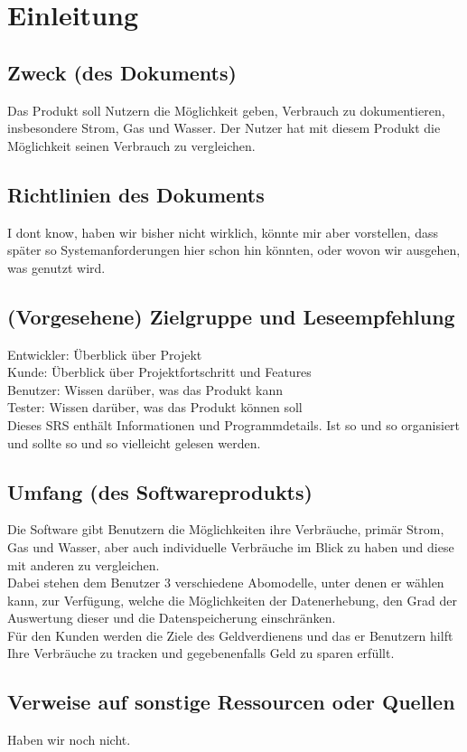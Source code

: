 \section{Einleitung}
\subsection{Zweck (des Dokuments)}
Das Produkt soll Nutzern die Möglichkeit geben, Verbrauch zu dokumentieren, insbesondere Strom, Gas und Wasser. Der Nutzer hat mit diesem Produkt die Möglichkeit seinen Verbrauch zu vergleichen.
\subsection{Richtlinien des Dokuments}
I dont know, haben wir bisher nicht wirklich, könnte mir aber vorstellen, dass später so Systemanforderungen hier schon hin könnten, oder wovon wir ausgehen, was genutzt wird.
\subsection{(Vorgesehene) Zielgruppe und Leseempfehlung}
Entwickler: Überblick über Projekt\\
Kunde: Überblick über Projektfortschritt und Features\\
Benutzer: Wissen darüber, was das Produkt kann\\
Tester:  Wissen darüber, was das Produkt können soll\\
Dieses SRS enthält Informationen und Programmdetails.
Ist so und so organisiert und sollte so und so vielleicht gelesen werden.
\subsection{Umfang (des Softwareprodukts)}
Die Software gibt Benutzern die Möglichkeiten ihre Verbräuche, primär Strom, Gas und Wasser, aber auch individuelle Verbräuche im Blick zu haben und diese mit anderen zu vergleichen.\\
Dabei stehen dem Benutzer 3 verschiedene Abomodelle, unter denen er wählen kann, zur Verfügung, welche die Möglichkeiten der Datenerhebung, den Grad der Auswertung dieser und die Datenspeicherung einschränken.\\
Für den Kunden werden die Ziele des Geldverdienens und das er Benutzern hilft Ihre Verbräuche zu tracken und gegebenenfalls Geld zu sparen erfüllt.
\subsection{Verweise auf sonstige Ressourcen oder Quellen}
Haben wir noch nicht.